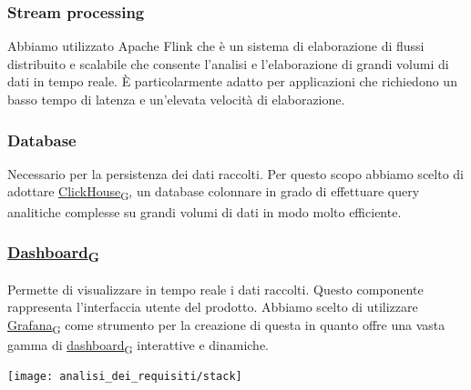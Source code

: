 	\subsubsection*{Stream processing}
	Abbiamo utilizzato Apache Flink che è un sistema di elaborazione di flussi distribuito e scalabile che consente l'analisi e l'elaborazione di grandi volumi di dati in tempo reale. È particolarmente adatto per applicazioni che richiedono un basso tempo di latenza e un'elevata velocità di elaborazione.
	\subsubsection*{Database}
	Necessario per la persistenza dei dati raccolti. Per questo scopo abbiamo scelto di adottare \href{https://7last.github.io/docs/pb/documentazione-interna/glossario\#clickhouse}{ClickHouse\textsubscript{G}}, un database colonnare in grado di effettuare query analitiche complesse su grandi volumi di dati in modo molto efficiente.
	\subsubsection*{\href{https://7last.github.io/docs/pb/documentazione-interna/glossario\#dashboard}{Dashboard\textsubscript{G}}}
	Permette di visualizzare in tempo reale i dati raccolti. Questo componente rappresenta l'interfaccia utente del prodotto. Abbiamo scelto di utilizzare \href{https://7last.github.io/docs/pb/documentazione-interna/glossario\#grafana}{Grafana\textsubscript{G}} come strumento per la creazione di questa in quanto offre una vasta gamma di \href{https://7last.github.io/docs/pb/documentazione-interna/glossario\#dashboard}{dashboard\textsubscript{G}} interattive e dinamiche.


\begin{center}
	\texttt{[image: analisi\_dei\_requisiti/stack]}
\end{center}

